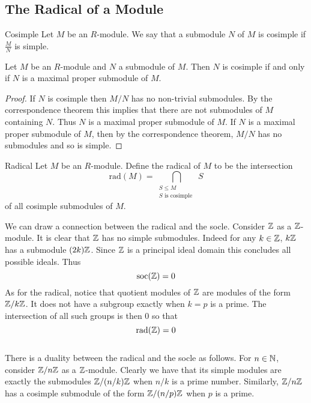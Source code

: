 \documentclass[a4paper]{article}
\begin{document}
\subsection{The Radical of a Module}
\begin{defn}{Cosimple}{} Let $M$ be an $R$-module. We say that a submodule $N$ of $M$ is cosimple if $\frac{M}{N}$ is simple. 
\end{defn}

\begin{lmm}{}{} Let $M$ be an $R$-module and $N$ a submodule of $M$. Then $N$ is cosimple if and only if $N$ is a maximal proper submodule of $M$. \tcbline
\begin{proof}
If $N$ is cosimple then $M/N$ has no non-trivial submodules. By the correspondence theorem this implies that there are not submodules of $M$ containing $N$. Thus $N$ is a maximal proper submodule of $M$. If $N$ is a maximal proper submodule of $M$, then by the correspondence theorem, $M/N$ has no submodules and so is simple. 
\end{proof}
\end{lmm}

\begin{defn}{Radical}{} Let $M$ be an $R$-module. Define the radical of $M$ to be the intersection $$\text{rad}(M)=\bigcap_{\substack{S\leq M\\S\text{ is cosimple }}}S$$ of all cosimple submodules of $M$. 
\end{defn}

We can draw a connection between the radical and the socle. Consider $\mathbb{Z}$ as a $\mathbb{Z}$-module. It is clear that $\mathbb{Z}$ has no simple submodules. Indeed for any $k\in\mathbb{Z}$, $k\mathbb{Z}$ has a submodule $(2k)\mathbb{Z}$. Since $\mathbb{Z}$ is a principal ideal domain this concludes all possible ideals. Thus $$\text{soc}(\mathbb{Z})=0$$ As for the radical, notice that quotient modules of $\mathbb{Z}$ are modules of the form $\mathbb{Z}/k\mathbb{Z}$. It does not have a subgroup exactly when $k=p$ is a prime. The intersection of all such groups is then $0$ so that $$\text{rad}(\mathbb{Z})=0$$~\\

There is a duality between the radical and the socle as follows. For $n\in\mathbb{N}$, consider $\mathbb{Z}/n\mathbb{Z}$ as a $\mathbb{Z}$-module. Clearly we have that its simple modules are exactly the submodules $\mathbb{Z}/(n/k)\mathbb{Z}$ when $n/k$ is a prime number. Similarly, $\mathbb{Z}/n\mathbb{Z}$ has a cosimple submodule of the form $\mathbb{Z}/(n/p)\mathbb{Z}$ when $p$ is a prime. \\~\\
\end{document}
